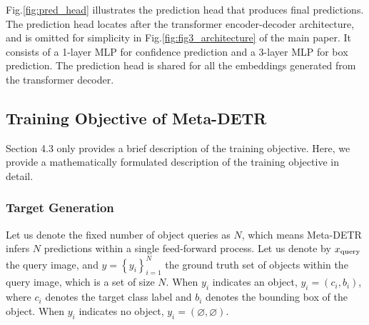 \documentclass[letterpaper]{article} \usepackage{aaai22}  \usepackage{times}  \usepackage{helvet}  \usepackage{courier}  \usepackage[hyphens]{url}  \usepackage{graphicx} \urlstyle{rm} \def\UrlFont{\rm}  \usepackage{natbib}  \usepackage{caption} \DeclareCaptionStyle{ruled}{labelfont=normalfont,labelsep=colon,strut=off} \frenchspacing  \setlength{\pdfpagewidth}{8.5in}  \setlength{\pdfpageheight}{11in}  \usepackage{algorithm}
\begin{document}
Fig.\;\ref{fig:pred_head} illustrates the prediction head that produces final predictions. The prediction head locates after the transformer encoder-decoder architecture, and is omitted for simplicity in Fig.\;\ref{fig:fig3_architecture} of the main paper. It consists of a 1-layer MLP for confidence prediction and a 3-layer MLP for box prediction. The prediction head is shared for all the embeddings generated from the transformer decoder.


\subsection{Training Objective of Meta-DETR}

Section 4.3 only provides a brief description of the training objective. Here, we provide a mathematically formulated description of the training objective in detail.

\subsubsection{Target Generation}
Let us denote the fixed number of object queries as $N$, which means Meta-DETR infers $N$ predictions within a single feed-forward process. Let us denote by $x_{\rm query}$ the query image, and $y \! = \! \left\{ y_i \right\}_{i=1}^{N}$ the ground truth set of objects within the query image, which is a set of size $N$. When $y_i$ indicates an object, $y_i \! = \! (c_i, b_i)$, where $c_i$ denotes the target class label and $b_i$ denotes the bounding box of the object. When $y_i$ indicates no object, $y_i \! = \! (\varnothing, \varnothing)$.
\end{document}
